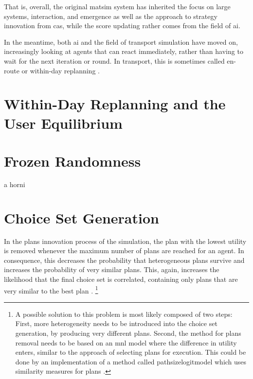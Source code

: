 That is, overall, the original \gls{matsim} system has inherited the focus on large systems, interaction, and emergence as well as the approach to strategy innovation from \gls{cas}, while the score updating rather comes from the field of \gls{ai}.

In the meantime, both \gls{ai} and the field of transport simulation have moved on, increasingly looking at agents that can react immediately, rather than having to wait for the next iteration or round.  In transport, this is sometimes called en-route or within-day replanning \citep[e.g.,][]{EmmerinkEtAl_TransResC_1995,balijepalli-2007}.


\section{Within-Day Replanning and the User Equilibrium}
\label{sec:researchavenues-withinday}

\vfill\eject
\section{Frozen Randomness}

a horni

\vfill\eject
\section{Choice Set Generation}
\label{sec:choicesets}


In the plans innovation process of the simulation, the plan with the lowest utility is removed whenever the maximum number of plans are reached for an agent. In consequence, this decreases the probability that heterogeneous plans survive and increases the probability of very similar plans. This, again, increases the likelihood that the final choice set is correlated, \ie containing only plans that are very similar to the best plan \citep[see][for a review on correlation of 
 routes]{Prato2009ChoiceModellingSurvey}.%
 \footnote{
 A possible solution to this problem is most likely composed of two steps:
 First, more heterogeneity needs to be introduced into the choice set generation, \eg by producing very different plans.
 Second, the method for plans removal needs to be based on an \gls{mnl} model where the difference in utility enters, similar to the approach of selecting plans for execution. This could be done by an implementation of a method called \gls{pathsizelogitmodel} which uses similarity measures for plans \citep[see][for a possible solution in route choice]{FrejingerBierlaire2007PathSizeLogit, BenAkivaBierlaiere1999DiscreteChoice}.
 }


